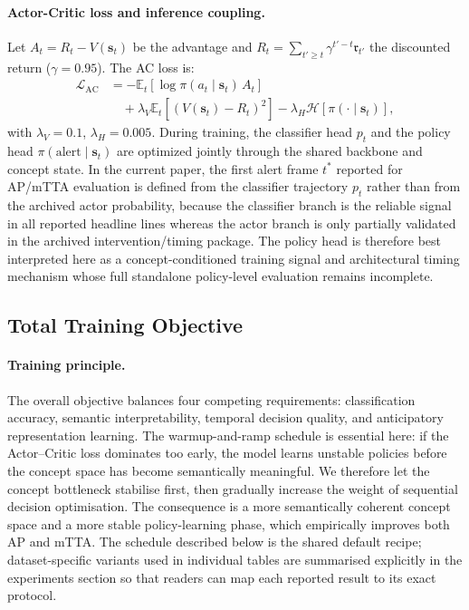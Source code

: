 \paragraph{Actor-Critic loss and inference coupling.}
Let $A_t = R_t - V(\mathbf{s}_t)$ be the advantage and
$R_t = \sum_{t'\geq t}\gamma^{t'-t}\mathfrak{r}_{t'}$ the discounted return
($\gamma{=}0.95$). The AC loss is:
\begin{align}
  \mathcal{L}_{\text{AC}}
  &= -\mathbb{E}_t[\log\pi(a_t\mid\mathbf{s}_t)\,A_t] \nonumber\\
  &\quad+ \lambda_V \mathbb{E}_t[(V(\mathbf{s}_t)-R_t)^2]
  - \lambda_H \mathcal{H}[\pi(\cdot\mid\mathbf{s}_t)],
  \label{eq:ac_loss}
\end{align}
with $\lambda_V{=}0.1$, $\lambda_H{=}0.005$.
During training, the classifier head $p_t$ and the policy head
$\pi(\text{alert}\mid\mathbf{s}_t)$ are optimized jointly through the shared
backbone and concept state. In the current paper, the first alert frame $t^*$
reported for AP/mTTA evaluation is defined from the classifier trajectory
$p_t$ rather than from the archived actor probability, because the classifier
branch is the reliable signal in all reported headline lines whereas the actor
branch is only partially validated in the archived intervention/timing package.
The policy head is therefore best interpreted here as a concept-conditioned
training signal and architectural timing mechanism whose full standalone
policy-level evaluation remains incomplete.

\subsection{Total Training Objective}

\paragraph{Training principle.}
The overall objective balances four competing requirements:
classification accuracy, semantic interpretability, temporal decision
quality, and anticipatory representation learning.
The warmup-and-ramp schedule is essential here: if the Actor--Critic
loss dominates too early, the model learns unstable policies before
the concept space has become semantically meaningful.
We therefore let the concept bottleneck stabilise first, then gradually
increase the weight of sequential decision optimisation.
The consequence is a more semantically coherent concept space and a more
stable policy-learning phase, which empirically improves both AP and mTTA.
The schedule described below is the shared default recipe; dataset-specific
variants used in individual tables are summarised explicitly in the experiments
section so that readers can map each reported result to its exact protocol.

